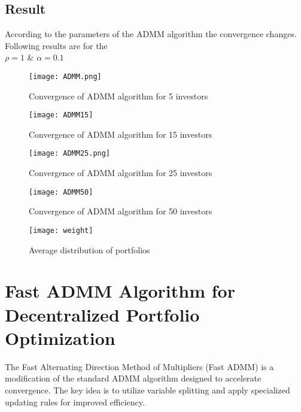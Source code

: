\documentclass{article}
\begin{document}
	
	\subsection{Result}
	
	According to the parameters of the ADMM algorithm the convergence changes.
	Following results are for the\\ $\rho = 1$ $\&$ $\alpha = 0.1$
	
	\begin{figure}[h]
		\begin{minipage}{0.49\linewidth}
			\centering
			\texttt{[image: ADMM.png]}
			\caption{Convergence of ADMM algorithm for 5 investors}
		\end{minipage}
		\begin{minipage}{0.49\linewidth}
			\centering
			\texttt{[image: ADMM15]}
			\caption{Convergence of ADMM algorithm for 15 investors}
		\end{minipage}
		\label{figu}
	\end{figure}
	\begin{figure}[h]
		\begin{minipage}{0.49\linewidth}
			\centering
			\texttt{[image: ADMM25.png]}
			\caption{Convergence of ADMM algorithm for 25 investors}
		\end{minipage}
		\begin{minipage}{0.49\linewidth}
			\centering
			\texttt{[image: ADMM50]}
			\caption{Convergence of ADMM algorithm for 50 investors}
		\end{minipage}
		\label{figv}
	\end{figure}
	
	\begin{figure}
		\centering
		\texttt{[image: weight]}
		\caption{Average distribution of portfolios}
	\end{figure}	
	
	\pagebreak
	
	\section*{Fast ADMM Algorithm for Decentralized Portfolio Optimization}
	

	
	The Fast Alternating Direction Method of Multipliers (Fast ADMM) is a modification of the standard ADMM algorithm designed to accelerate convergence. The key idea is to utilize variable splitting and apply specialized updating rules for improved efficiency.
	
\end{document}

